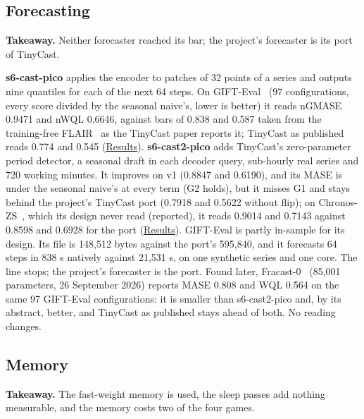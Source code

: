 \documentclass[10pt]{article}
\begin{document}
\subsection{Forecasting}\label{sec:6.5}

\textbf{Takeaway.} Neither forecaster reached its bar; the project's forecaster is its port of TinyCast.

\textbf{s6-cast-pico} applies the encoder to patches of 32 points of a series and outputs nine quantiles for each of the next 64 steps. On GIFT-Eval~\cite{aksu2024gifteval} (97 configurations, every score divided by the seasonal naive's, lower is better) it reads nGMASE 0.9471 and nWQL 0.6646, against bars of 0.838 and 0.587 taken from the training-free FLAIR~\cite{honda2026flair} as the TinyCast paper reports it; TinyCast as published~\cite{steinhauser2026tinycast} reads 0.774 and 0.545 (\href{https://maxgfr.github.io/skycmd/results/\#s6-cast-pico-failed}{Results}). \textbf{s6-cast2-pico} adds TinyCast's zero-parameter period detector, a seasonal draft in each decoder query, sub-hourly real series and 720 working minutes. It improves on v1 (0.8847 and 0.6190), and its MASE is under the seasonal naive's at every term (G2 holds), but it misses G1 and stays behind the project's TinyCast port (0.7918 and 0.5622 without flip); on Chronos-ZS~\cite{ansari2024chronos}, which its design never read (reported), it reads 0.9014 and 0.7143 against 0.8598 and 0.6928 for the port (\href{https://maxgfr.github.io/skycmd/results/\#s6-cast2-pico-failed}{Results}). GIFT-Eval is partly in-sample for its design. Its file is 148,512 bytes against the port's 595,840, and it forecasts 64 steps in 838 \textmu{}s natively against 21,531 \textmu{}s, on one synthetic series and one core. The line stops; the project's forecaster is the port. Found later, Fracast-0~\cite{zhan2026fracast} (85,001 parameters, 26 September 2026) reports MASE 0.808 and WQL 0.564 on the same 97 GIFT-Eval configurations: it is smaller than s6-cast2-pico and, by its abstract, better, and TinyCast as published stays ahead of both. No reading changes.

\subsection{Memory}\label{sec:6.6}

\textbf{Takeaway.} The fast-weight memory is used, the sleep passes add nothing measurable, and the memory costs two of the four games.
\end{document}
